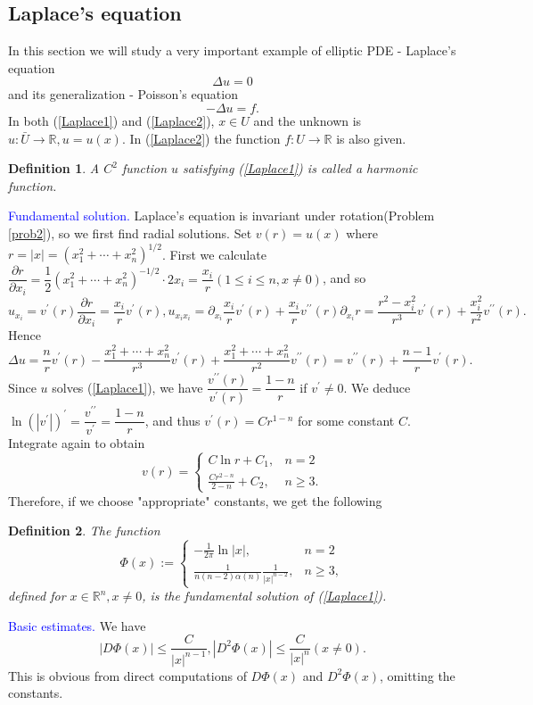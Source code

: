 \documentclass[hyperref,UTF8,12pt]{article}
\numberwithin{equation}{subsection}
\theoremstyle{plain}
\newtheorem{definition}{Definition}
\theoremstyle{definition}
\numberwithin{theorem}{section}
\numberwithin{lemma}{section}
\numberwithin{proposition}{section}
\numberwithin{remark}{section}
\numberwithin{corollary}{section}
\numberwithin{definition}{section}
\numberwithin{problem}{section}
\numberwithin{example}{section}
\newcommand{\ptl}{\partial}
\newcommand{\mr}{\mathbb{R}}
\renewcommand{\leq}{\leqslant}
\renewcommand{\geq}{\geqslant}
\begin{document}
\subsection{Laplace's equation}
In this section we will study a very important example of elliptic PDE - Laplace's equation{\color{red}\[\Delta u=0\tag{5}\label{Laplace1}\]}and its generalization - Poisson's equation{\color{red}\[-\Delta u=f.\tag{6}\label{Laplace2}\]}In both (\ref{Laplace1}) and (\ref{Laplace2}), $x\in U$ and the unknown is $u:\bar{U}\to\mr,u=u(x)$. In (\ref{Laplace2}) the function $f:U\to\mr$ is also given.
\begin{definition}
A $C^2$ function $u$ satisfying \textup{(\ref{Laplace1})} is called a \emph{harmonic} function.
\end{definition}
\noindent\textcolor{blue}{Fundamental solution.} Laplace's equation is invariant under rotation(Problem \ref{prob2}), so we first find radial solutions. Set $v(r)=u(x)$ where $r=|x|=(x_1^2+\cdots+x_n^2)^{1/2}$. First we calculate $\dfrac{\ptl r}{\ptl x_i}= \dfrac{1}{2}(x_1^2+\cdots+x_n^2)^{-1/2}\cdot2x_i=\dfrac{x_i}{r}(1\leq i\leq n,x\neq0)$, and so\[u_{x_i}=v^\prime(r)\frac{\ptl r}{\ptl x_i}=\frac{x_i}{r}v^\prime(r), u_{x_ix_i}=\ptl_{x_i}\frac{x_i}{r}v^\prime(r)+\frac{x_i}{r}v^{\prime\prime}(r)\ptl_{x_i}r=\frac{r^2-x_i^2}{r^3}v^\prime(r)+\frac{x_i^2}{r^2}v^{\prime\prime}(r).\]Hence\[
\Delta u=\frac{n}{r}v^\prime(r)-\frac{x_1^2+\cdots+x_n^2}{r^3}v^\prime(r)+ \frac{x_1^2+\cdots+x_n^2}{r^2}v^{\prime\prime}(r)=v^{\prime\prime}(r)+\frac{n-1}{r}v^\prime(r).\]Since $u$ solves (\ref{Laplace1}), we have $\dfrac{v^{\prime\prime}(r)}{v^\prime(r)}=\dfrac{1-n}{r}$ if $v^\prime\neq0$. We deduce $\ln(|v^\prime|)^\prime=\dfrac{v^{\prime\prime}}{v^\prime}=\dfrac{1-n}{r}$, and thus $v^\prime(r)=Cr^{1-n}$ for some constant $C$. Integrate again to obtain \[v(r)=\begin{cases}
	C\ln r+C_1,&n=2\\\frac{Cr^{2-n}}{2-n}+C_2,&n\geq3.
\end{cases}\]Therefore, if we choose "appropriate" constants, we get the following
\begin{definition}
The function
\[\Phi(x):=\begin{cases}-\frac{1}{2\pi}\ln|x|,&n=2\\ \frac{1}{n(n-2)\alpha(n)} \frac{1}{|x|^{n-2}},&n\geq3,\end{cases}\tag{7}\]
defined for $x\in\mr^n,x\neq0$, is the \emph{fundamental solution} of \textup{(\ref{Laplace1})}.
\end{definition}
\noindent\textcolor{blue}{Basic estimates.} We have \[\tag{8}\label{8}
|D\Phi(x)|\leq\frac{C}{|x|^{n-1}},|D^2\Phi(x)|\leq\frac{C}{|x|^n}(x\neq0).\]This is obvious from direct computations of $D\Phi(x)$ and $D^2\Phi(x)$, omitting the constants.
\end{document}
